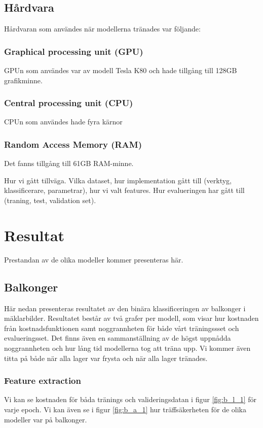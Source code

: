 \documentclass[]{kththesis}
\begin{document}
\section{Hårdvara}
Hårdvaran som användes när modellerna tränades var följande:

\subsection{Graphical processing unit (GPU)}
GPUn som användes var av modell Tesla K80 och hade tillgång till 128GB grafikminne.

\subsection{Central processing unit (CPU)}
CPUn som användes hade fyra kärnor 

\subsection{Random Access Memory (RAM)}
Det fanns tillgång till 61GB RAM-minne.


Hur vi gått tillväga. Vilka dataset, hur implementation gått till (verktyg, klassificerare, parametrar), hur vi valt features.
Hur evalueringen har gått till (traning, test, validation set).
\chapter{Resultat}
Prestandan av de olika modeller kommer presenteras här.

\section{Balkonger}
Här nedan presenteras resultatet av den binära klassificeringen av balkonger i mäklarbilder. Resultatet består av två grafer per modell, som visar hur kostnaden från kostnadsfunktionen samt noggrannheten för både vårt träningssset och evalueringsset. Det finns även en sammanställning av de högst uppnådda noggrannheten och hur lång tid modellerna tog att träna upp. Vi kommer även titta på både när alla lager var frysta och när alla lager tränades.

\subsection{Feature extraction}
Vi kan se kostnaden för båda tränings och valideringsdatan i figur \ref{fig:b_l_1} för varje epoch. Vi kan även se i figur \ref{fig:b_a_1} hur träffsäkerheten för de olika modeller var på balkonger.
\end{document}
